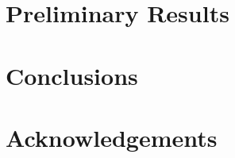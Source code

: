 \documentclass{sig-alternate}
\begin{document}
%
%
\section{Preliminary Results}
\label{sec:results}

%
%
\section{Conclusions}
\label{sec:conclusions}

%
%
\section{Acknowledgements}



\end{document}
